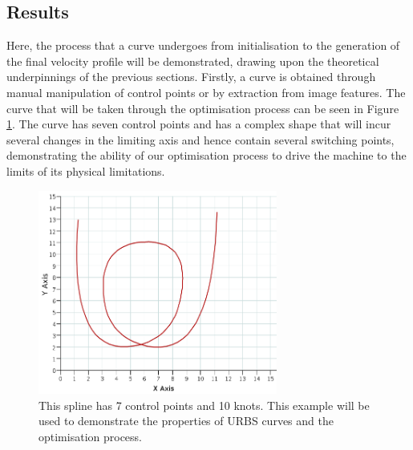 \subsection{Results}
Here, the process that a curve undergoes from initialisation to the generation of the final velocity profile will be demonstrated, drawing upon the theoretical underpinnings of the previous sections.
Firstly, a curve is obtained through manual manipulation of control points or by extraction from image features. The curve that will be taken through the optimisation process can be seen in Figure \ref{fig:example}. The curve has seven control points and has a complex shape that will incur several changes in the limiting axis and hence contain several switching points, demonstrating the ability of our optimisation process to drive the machine to the limits of its physical limitations.

\begin{figure}[htbp]  
\centering
\includegraphics[width=0.7\textwidth]{figures/optimisation/exampleSpline.png}
\caption[Optimisation example curve]{ This spline has 7 control points and 10 knots. This example will be used to demonstrate the properties of URBS curves and the optimisation process.
\label{fig:example}}
\end{figure}

